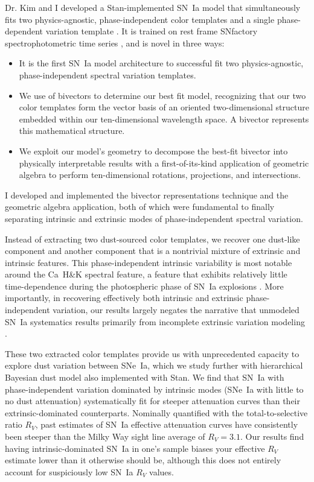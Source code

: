 \documentclass[modern]{aastex631}
\begin{document}
Dr. Kim and I developed a Stan-implemented SN~Ia model that simultaneously fits two physics-agnostic, phase-independent color templates and a single phase-dependent variation template \citep{Stan}. 
It is trained on rest frame SNfactory spectrophotometric time series \citep{Aldering2002}, and is novel in three ways:
\begin{itemize}
    \item It is the first SN~Ia model architecture to successful fit two physics-agnostic, phase-independent spectral variation templates. 
    \item We use of bivectors to determine our best fit model, recognizing that our two color templates form the vector basis of an oriented two-dimensional structure embedded within our ten-dimensional wavelength space. A bivector represents this mathematical structure. 
    \item We exploit our model's geometry to decompose the best-fit bivector into physically interpretable results with a first-of-its-kind application of geometric algebra to perform ten-dimensional rotations, projections, and intersections. 
\end{itemize}
I developed and implemented the bivector representations technique and the geometric algebra application, both of which were fundamental to finally separating intrinsic and extrinsic modes of phase-independent spectral variation. 

Instead of extracting two dust-sourced color templates, we recover one dust-like component and another component that is a nontrivial mixture of extrinsic and intrinsic features. 
This phase-independent intrinsic variability is most notable around the Ca~H\&K spectral feature, a feature that exhibits relatively little time-dependence during the photospheric phase of SN~Ia explosions \citep{Branch1993,Riess1996}. 
More importantly, in recovering effectively both intrinsic and extrinsic phase-independent variation, our results largely negates the narrative that unmodeled SN~Ia systematics results primarily from incomplete extrinsic variation modeling \citep{Brout2019}.

These two extracted color templates provide us with unprecedented capacity to explore dust variation between SNe~Ia, which we study further with hierarchical Bayesian dust model also implemented with Stan. 
We find that SN~Ia with phase-independent variation dominated by intrinsic modes (SNe~Ia with little to no dust attenuation) systematically fit for steeper attenuation curves than their extrinsic-dominated counterparts. 
Nominally quantified with the total-to-selective ratio $R_V$, past estimates of SN~Ia effective attenuation curves have consistently been steeper than the Milky Way sight line average of $R_V=3.1$.
Our results find having intrinsic-dominated SN~Ia in one's sample biases your effective $R_V$ estimate lower than it otherwise should be, although this does not entirely account for suspiciously low SN~Ia $R_V$ values. 
\end{document}
